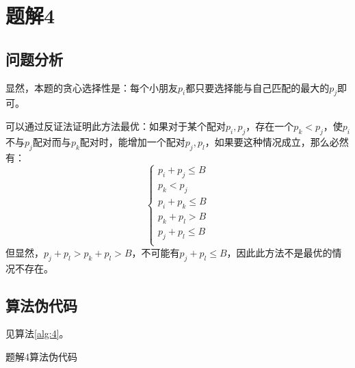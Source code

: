 \section{题解4}
\subsection{问题分析}
显然，本题的贪心选择性是：每个小朋友$p_i$都只要选择能与自己匹配的最大的$p_j$即可。

可以通过反证法证明此方法最优：如果对于某个配对$p_i,p_j$，存在一个$p_k<p_j$，使$p_i$不与$p_j$配对而与$p_k$配对时，能增加一个配对$p_j,p_l$，如果要这种情况成立，那么必然有：
$$
\left\{
\begin{aligned}
    p_i+p_j\leq B\\
    p_k<p_j\\
    p_i+p_k\leq B\\
    p_k+p_l>B\\
    p_j+p_l\leq B\\
\end{aligned}
\right.
$$
但显然，$p_j+p_l>p_k+p_l>B$，不可能有$p_j+p_l\leq B$，因此此方法不是最优的情况不存在。

\subsection{算法伪代码}
见算法\ref{alg:4}。
\begin{algorithm}[htbp]
\caption{题解4算法伪代码}\label{alg:4}
\end{algorithm}
